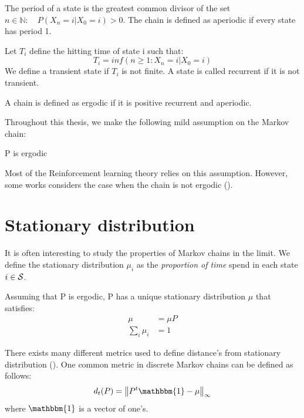\begin{definition}
The period of a state is the greatest common divisor of the set {$n \in  \mathbb{N} : \quad P(X_n=i|X_0=i) > 0$}. The chain is defined as aperiodic if every state has period 1.
\end{definition}
\begin{definition}
Let $T_i$ define the hitting time of state i such that:
\begin{equation}
    T_i = inf(n \geq 1 : X_n = i | X_0 = i)
\end{equation}
We define a transient state if $T_i$ is not finite. A state is called recurrent if it is not transient.
\end{definition}
\begin{definition}
A chain is defined as ergodic if it is positive recurrent and aperiodic.
\end{definition}
Throughout this thesis, we make the following mild assumption on the Markov chain:
\begin{assumption}
P is ergodic
\end{assumption}
Most of the Reinforcement learning theory relies on this assumption. However, some works considers the case when the chain is not ergodic (\cite{leike2016nonparametric}).

\section{Stationary distribution}
It is often interesting to study the properties of Markov chains in the limit. We define the stationary distribution $\mu_i$ as the \emph{proportion of time} spend in each state $i \in \mathcal{S}$.
\begin{definition}
Assuming that P is ergodic, P has a unique stationary distribution $\mu$ that satisfies:
\begin{equation}
\begin{split}
    \mu &= \mu P \\
    \sum_i \mu_i &= 1
\end{split}
\end{equation}
\end{definition}
There exists many different metrics used to define distance's from stationary distribution (\cite{levin2017markov}). One common metric in discrete Markov chains can be defined as follows:
\begin{equation}
    d_t(P) = \norm{P^t \mathbbm{1} - \mu}_{ \infty } 
    \label{eq:d_markov}
\end{equation}
where $\mathbbm{1}$ is a vector of one's.
